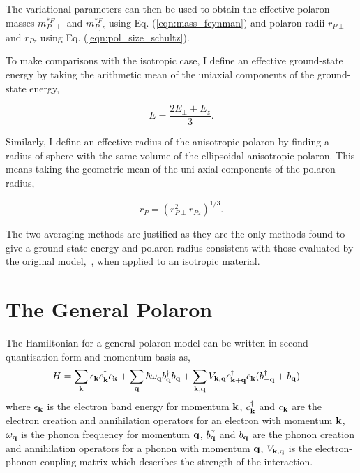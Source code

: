 The variational parameters can then be used to obtain the effective polaron masses $m^{*F}_{P,\perp}$ and $m^{*F}_{P, z}$ using Eq. (\ref{eqn:mass_feynman}) and polaron radii $r_{P\perp}$ and $r_{Pz}$ using Eq. (\ref{eqn:pol_size_schultz}). 

To make comparisons with the isotropic case, I define an effective ground-state energy by taking the arithmetic mean of the uniaxial components of the ground-state energy,

\begin{equation}
    E = \frac{2 E_\perp + E_z}{3}.
\end{equation}

Similarly, I define an effective radius of the anisotropic polaron by finding a radius of sphere with the same volume of the ellipsoidal anisotropic polaron. This means taking the geometric mean of the uni-axial components of the polaron radius, 

\begin{equation}
    r_P = \left(r^2_{P\perp} r_{Pz}\right)^{1/3}.
\end{equation}

The two averaging methods are justified as they are the only methods found to give a ground-state energy and polaron radius consistent with those evaluated by the original model,~\cite{feynman_slow_1955}, when applied to an isotropic material.

\section{The General Polaron}
\label{sec:chap-third-fourth}

The Hamiltonian for a general polaron model \cite{Alexandrov2009} can be written in second-quantisation form and momentum-basis as,
\begin{equation}
    \begin{aligned}
        H &= \sum_{\vb{k}} \epsilon_{\vb{k}} c^\dagger_{\vb{k}} c_{\vb{k}} + \sum_{\vb{q}} \hbar \omega_{\vb{q}} b^\dagger_{\vb{q}} b_{\vb{q}} + \sum_{\vb{k},\vb{q}} V_{\vb{k}, \vb{q}} c^\dagger_{\vb{k}+\vb{q}} c_{\vb{k}} (b^\dagger_{\vb{-q}} + b_{\vb{q}})
    \end{aligned}
\end{equation} 
where $\epsilon_{\vb{k}}$ is the electron band energy for momentum $\vb{k}$, $c^\dagger_{\vb{k}}$ and $c_{\vb{k}}$ are the electron creation and annihilation operators for an electron with momentum $\vb{k}$, $\omega_{\vb{q}}$ is the phonon frequency for momentum $\vb{q}$, $b^\gamma_{\vb{q}}$ and $b_{\vb{q}}$ are the phonon creation and annihilation operators for a phonon with momentum $\vb{q}$, $V_{\vb{k}, \vb{q}}$ is the electron-phonon coupling matrix which describes the strength of the interaction.
\newline

